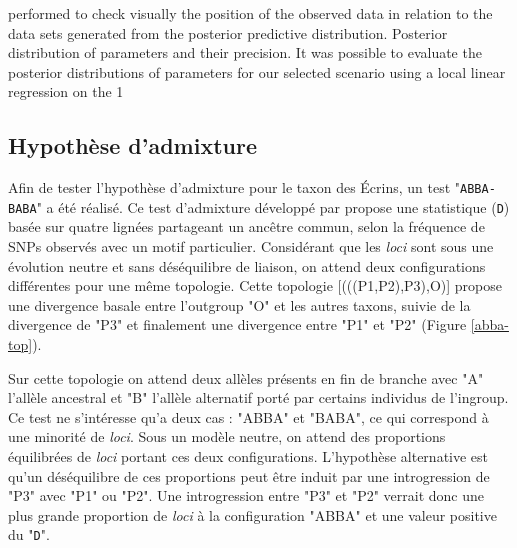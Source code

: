 performed to check visually the position of the observed data in relation to the data sets generated from the posterior predictive distribution. Posterior distribution of parameters and their precision. It was possible to evaluate the posterior distributions of parameters for our selected scenario using a local linear regression on the 1%

\subsection{Hypothèse d'admixture}

Afin de tester l'hypothèse d'admixture pour le taxon des Écrins, un test "\verb|ABBA-BABA|" a été réalisé. Ce test d'admixture développé par \citet{Durand2011} propose une statistique (\verb|D|) basée sur quatre lignées partageant un ancêtre commun, selon la fréquence de SNPs observés avec un motif particulier. 
 Considérant que les \textit{loci} sont sous une évolution neutre et sans déséquilibre de liaison, on attend deux configurations différentes pour une même topologie. Cette topologie [(((P1,P2),P3),O)] propose une divergence basale entre l'outgroup "O" et les autres taxons, suivie de la divergence de "P3" et finalement une divergence entre "P1" et "P2" (Figure \ref{abba-top}). 

Sur cette topologie on attend deux allèles présents en fin de branche avec "A" l'allèle ancestral et "B" l'allèle alternatif porté par certains individus de l'ingroup.
 Ce test ne s'intéresse qu'a deux cas : "ABBA" et "BABA", ce qui correspond à une minorité de \textit{loci}. Sous un modèle neutre, on attend des proportions équilibrées de \textit{loci} portant ces deux configurations. L'hypothèse alternative est qu'un déséquilibre de ces proportions peut être induit par une introgression de "P3" avec "P1" ou "P2". Une introgression entre "P3" et "P2" verrait donc une plus grande proportion de \textit{loci} à la configuration "ABBA" et une valeur positive du "\verb|D|".
 
